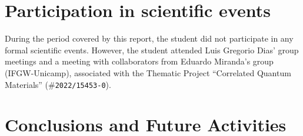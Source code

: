 \documentclass[12pt]{report}
\begin{document}
\chapter{Participation in scientific events} \label{chp:particEvento}

During the period covered by this report, the student did not participate in any formal scientific events. However, the student attended Luis Gregorio Dias' group meetings and a meeting with collaborators from Eduardo Miranda's group (IFGW-Unicamp), associated with the Thematic Project ``Correlated Quantum Materials'' (\#\texttt{2022/15453-0}).


\chapter{Conclusions and Future Activities} \label{chp:conclusions}

%

%




\end{document}
